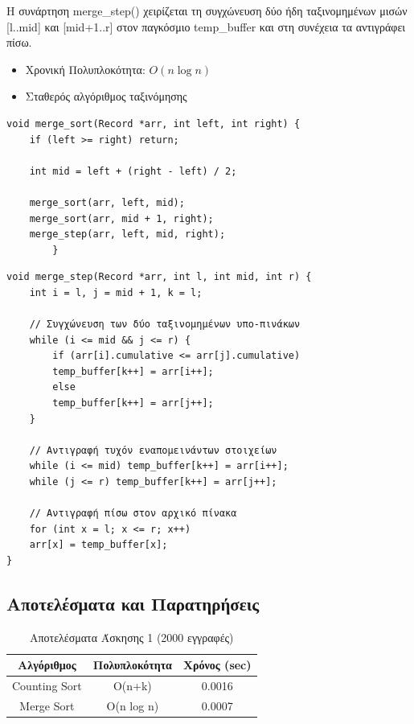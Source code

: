\documentclass[a4paper,12pt]{article}
\begin{document}
	Η συνάρτηση merge\_step() χειρίζεται τη συγχώνευση δύο ήδη ταξινομημένων μισών [l..mid] και [mid+1..r] στον παγκόσμιο temp\_buffer και στη συνέχεια τα αντιγράφει πίσω.
	
	\begin{itemize}
		\item Χρονική Πολυπλοκότητα: $O(n \log n)$
		\item Σταθερός αλγόριθμος ταξινόμησης
	\end{itemize}
	
	\begin{lstlisting}[caption=Υλοποίηση Merge Sort]
void merge_sort(Record *arr, int left, int right) {
	if (left >= right) return;
	
	int mid = left + (right - left) / 2;
	
	merge_sort(arr, left, mid);
	merge_sort(arr, mid + 1, right);
	merge_step(arr, left, mid, right);
		}
	\end{lstlisting}
	
	\begin{lstlisting}[caption=Υλοποίηση Merge Step]
void merge_step(Record *arr, int l, int mid, int r) {
	int i = l, j = mid + 1, k = l;
	
	// Συγχώνευση των δύο ταξινομημένων υπο-πινάκων
	while (i <= mid && j <= r) {
		if (arr[i].cumulative <= arr[j].cumulative)
		temp_buffer[k++] = arr[i++];
		else
		temp_buffer[k++] = arr[j++];
	}
	
	// Αντιγραφή τυχόν εναπομεινάντων στοιχείων
	while (i <= mid) temp_buffer[k++] = arr[i++];
	while (j <= r) temp_buffer[k++] = arr[j++];
	
	// Αντιγραφή πίσω στον αρχικό πίνακα
	for (int x = l; x <= r; x++)
	arr[x] = temp_buffer[x];
}
	\end{lstlisting}
	
	\subsection{Αποτελέσματα και Παρατηρήσεις}
	
	\begin{table}[H]
		\centering
		\begin{tabular}{|c|c|c|}
			\hline
			\textbf{Αλγόριθμος} & \textbf{Πολυπλοκότητα} & \textbf{Χρόνος (sec)} \\
			\hline
			Counting Sort & O(n+k) & 0.0016 \\
			Merge Sort & O(n log n) & 0.0007 \\
			\hline
		\end{tabular}
		\caption{Αποτελέσματα Άσκησης 1 (2000 εγγραφές)}
	\end{table}
	
\end{document}
